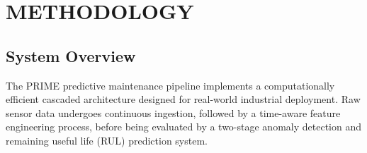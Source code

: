 \documentclass[conference]{IEEEtran}
\begin{document}

\section{METHODOLOGY}

\subsection{System Overview}
The PRIME predictive maintenance pipeline implements a computationally efficient cascaded architecture designed for real-world industrial deployment. Raw sensor data undergoes continuous ingestion, followed by a time-aware feature engineering process, before being evaluated by a two-stage anomaly detection and remaining useful life (RUL) prediction system.
\end{document}
